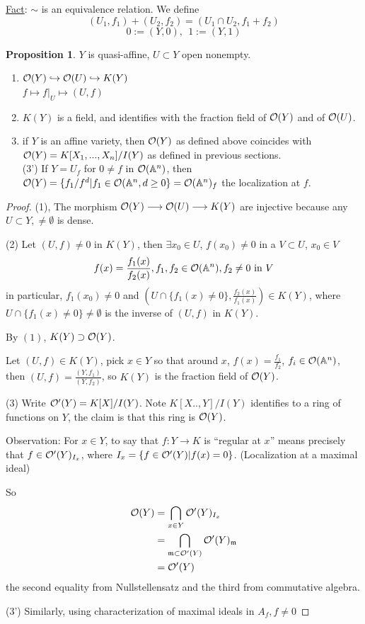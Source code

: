 \documentclass[11pt]{article}
\theoremstyle{definition}
\newtheorem{prop}[thm]{Proposition}
\newcommand{\affn}{\mathbb A}
\newcommand{\scm}{{\mathfrak m}}
\newcommand{\calo}{{\cal O}}
\newcommand{\lrta}{\longrightarrow}
\newcommand{\inj}{\hookrightarrow}
\begin{document}
\underline{Fact}: $\sim$ is an equivalence relation. We define
$$
(U_1,f_1)+(U_2,f_2)=(U_1\cap U_2,f_1+f_2)
$$
$$
0:=(Y,0),\ \ 1:=(Y,1)
$$
\begin{prop}
$Y$ is quasi-affine, $U\subset Y$ open nonempty.
\begin{enumerate}
\item $\calo(Y)\inj\calo(U)\inj K(Y)$\\
$f\longmapsto f|_U\mapsto (U,f)$
\item $K(Y)$ is a field, and identifies with the fraction field of $\calo(Y)$ and of $\calo(U)$.
\item if $Y$ is an affine variety, then $\calo(Y)$ as defined above coincides with $\calo(Y)=K[X_1,...,X_n]/I(Y)$ as defined in previous sections.\\

(3') If $Y=U_f$ for $0\neq f$ in $\calo(\affn^n)$, then $\calo(Y)=\{f_1/f^d|f_1\in \calo(\affn^n, d\geq 0\}=\calo(\affn^n)_f$ the localization at $f$.
\end{enumerate}
\end{prop}
\begin{proof}
(1), The morphism $\calo(Y)\lrta \calo(U)\lrta K(Y)$ are injective because any $U\subset Y,\neq \emptyset$ is dense.

(2) Let $(U,f)\neq 0$ in $K(Y)$, then $\exists x_0\in U$, $f(x_0)\neq 0$ in a $V\subset U$, $x_0\in V$
$$
f(x)=\frac{f_1(x)}{f_2(x)}, f_1,f_2\in\calo(\affn^n), f_2\neq 0\text{ in }V
$$
in particular, $f_1(x_0)\neq 0$ and $( U\cap\{f_1(x)\neq 0\},\frac{f_2(x)}{f_1(x)})\in K(Y)$, where $U\cap\{f_1(x)\neq 0\}\neq \emptyset$ is the inverse of $(U,f)$ in $K(Y)$. 

By $(1)$, $K(Y)\supset \calo(Y)$.

Let $(U,f)\in K(Y)$, pick $x\in Y$ so that around $x$, $f(x)=\frac{f_1}{f_2}$, $f_i\in\calo(\affn^n)$, then $(U,f)=\frac{(Y,f_1)}{(Y,f_2)}$, so $K(Y)$ is the fraction field of $\calo(Y)$.

(3) Write $\calo'(Y)=K[X]/I(Y)$.  Note $K[X..,Y]/I(Y)$ identifies to a ring of functions on $Y$, the claim is that this ring is $\calo(Y)$.

Observation:
For $x\in Y$, to say that $f: Y\lrta K$ is ``regular at $x$'' means precisely that $f\in \calo'(Y)_{I_x}$, where $I_x=\{f\in\calo'(Y)|f(x)=0\}$. (Localization at  a maximal ideal)

So $$
\begin{aligned}
\calo(Y)&=\bigcap_{x\in Y}\calo'(Y)_{I_x}\\
&=\bigcap_{\scm\subset\calo'(Y)}\calo'(Y)_\scm\\
&=\calo'(Y)
\end{aligned}
$$
the second equality from Nullstellensatz and the third from commutative algebra.

(3') Similarly, using characterization of maximal ideals in $A_f, f\neq 0$
\end{proof}
\end{document}
